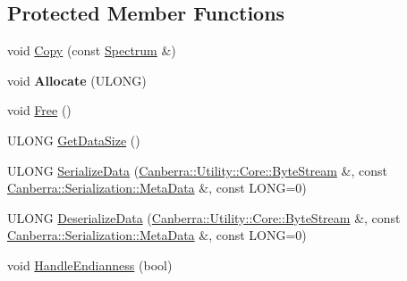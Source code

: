 \subsection*{Protected Member Functions}
\begin{DoxyCompactItemize}
\item 
void \hyperlink{class_canberra_1_1_data_types_1_1_spectroscopy_1_1_spectrum_a358ff2d9dcd18a0526c40b60d5e8e287_a358ff2d9dcd18a0526c40b60d5e8e287}{Copy} (const \hyperlink{class_canberra_1_1_data_types_1_1_spectroscopy_1_1_spectrum}{Spectrum} \&)
\item 
\mbox{\label{class_canberra_1_1_data_types_1_1_spectroscopy_1_1_spectrum_aaa6aa946c259e3dcc89c313a1812eedc}} 
void {\bfseries Allocate} (U\+L\+O\+NG)
\item 
void \hyperlink{class_canberra_1_1_data_types_1_1_spectroscopy_1_1_spectrum_abc604938d84d4da9bdf48425c189c723_abc604938d84d4da9bdf48425c189c723}{Free} ()
\item 
U\+L\+O\+NG \hyperlink{class_canberra_1_1_data_types_1_1_spectroscopy_1_1_spectrum_a9dcde157042c3229d5d2e14e71cde914_a9dcde157042c3229d5d2e14e71cde914}{Get\+Data\+Size} ()
\item 
U\+L\+O\+NG \hyperlink{class_canberra_1_1_data_types_1_1_spectroscopy_1_1_spectrum_adf7ad1009e06e12a15344e479cede754_adf7ad1009e06e12a15344e479cede754}{Serialize\+Data} (\hyperlink{class_canberra_1_1_utility_1_1_core_1_1_byte_stream}{Canberra\+::\+Utility\+::\+Core\+::\+Byte\+Stream} \&, const \hyperlink{class_canberra_1_1_serialization_1_1_meta_data}{Canberra\+::\+Serialization\+::\+Meta\+Data} \&, const L\+O\+NG=0)
\item 
U\+L\+O\+NG \hyperlink{class_canberra_1_1_data_types_1_1_spectroscopy_1_1_spectrum_ae241fce6dd51ef5d18cbc7197176c08e_ae241fce6dd51ef5d18cbc7197176c08e}{Deserialize\+Data} (\hyperlink{class_canberra_1_1_utility_1_1_core_1_1_byte_stream}{Canberra\+::\+Utility\+::\+Core\+::\+Byte\+Stream} \&, const \hyperlink{class_canberra_1_1_serialization_1_1_meta_data}{Canberra\+::\+Serialization\+::\+Meta\+Data} \&, const L\+O\+NG=0)
\item 
void \hyperlink{class_canberra_1_1_data_types_1_1_spectroscopy_1_1_spectrum_a6f7a1311daeb8057eb6b134fe46717ee_a6f7a1311daeb8057eb6b134fe46717ee}{Handle\+Endianness} (bool)
\end{DoxyCompactItemize}
